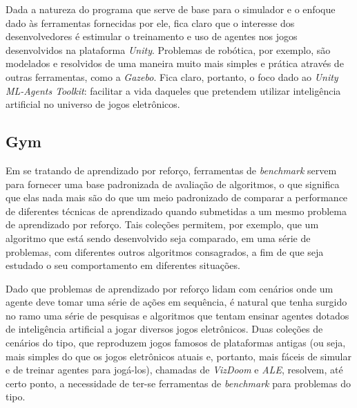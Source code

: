 \documentclass[cic,tc]{iiufrgs}
\begin{document}
Dada a natureza do programa que serve de base para o simulador e o enfoque dado
às ferramentas fornecidas por ele, fica claro que o interesse dos
desenvolvedores é estimular o treinamento e uso de agentes nos jogos
desenvolvidos na plataforma \textit{Unity}. Problemas de robótica, por exemplo,
são modelados e resolvidos de uma maneira muito mais simples e prática através
de outras ferramentas, como a \textit{Gazebo}. Fica claro, portanto, o foco dado
ao \textit{Unity ML-Agents Toolkit}: facilitar a vida daqueles que pretendem
utilizar inteligência artificial no universo de jogos eletrônicos.




\subsection{Gym}

\label{gym_section}


Em se tratando de aprendizado por reforço, ferramentas de \textit{benchmark}
servem para fornecer uma base padronizada de avaliação de algoritmos, o que
significa que elas nada mais são do que um meio padronizado de comparar a
performance de diferentes técnicas de aprendizado quando submetidas a um mesmo
problema de aprendizado por reforço. Tais coleções permitem, por exemplo, que
um algoritmo que está sendo desenvolvido seja comparado, em uma série de
problemas, com diferentes outros algoritmos consagrados, a fim de que seja
estudado o seu comportamento em diferentes situações.


Dado que problemas de aprendizado por reforço lidam com cenários onde um agente
deve tomar uma série de ações em sequência, é natural que tenha surgido no ramo
uma série de pesquisas e algoritmos que tentam ensinar agentes dotados de
inteligência artificial a jogar diversos jogos eletrônicos. Duas coleções de
cenários do tipo, que reproduzem jogos famosos de plataformas antigas (ou seja,
mais simples do que os jogos eletrônicos atuais e, portanto, mais fáceis de
simular e de treinar agentes para jogá-los), chamadas de \textit{VizDoom} e
\textit{ALE}, resolvem, até certo ponto, a necessidade de ter-se ferramentas
de \textit{benchmark} para problemas do tipo.
\end{document}
